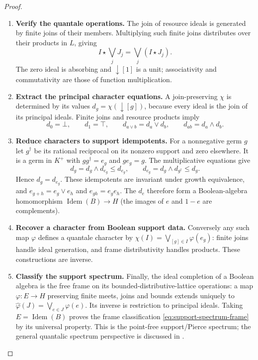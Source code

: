 \documentclass[11pt,a4paper]{article}
\numberwithin{algorithm}{section}
\numberwithin{equation}{section}
\theoremstyle{definition}
\theoremstyle{remark}
\theoremstyle{plain}
\theoremstyle{definition}
\theoremstyle{plain}
\begin{document}
\begin{proof}\leavevmode
\begin{enumerate}[leftmargin=*,align=left]
\item \textbf{Verify the quantale operations.}
The join of resource ideals is generated by finite joins of their
members.  Multiplying such finite joins distributes over their
products in $L$, giving
\[
 I\star\bigvee_jJ_j=\bigvee_j(I\star J_j).
\]
The zero ideal is absorbing and $\downarrow[1]$ is a unit;
associativity and commutativity are those of function multiplication.

\item \textbf{Extract the principal character equations.}
A join-preserving $\chi$ is determined by its values
$d_g=\chi(\downarrow[g])$, because every ideal is the
join of its principal ideals.  Finite joins and resource products
imply
\[
 d_0=\bot,\qquad d_1=\top,\qquad
 d_{a\vee b}=d_a\vee d_b,\qquad d_{ab}=d_a\wedge d_b.
\]

\item \textbf{Reduce characters to support idempotents.}
For a nonnegative germ $g$ let $g^\dagger$ be its rational
reciprocal on its nonzero support and zero elsewhere.  It is a
germ in $K^+$ with $gg^\dagger=e_g$ and $ge_g=g$.
The multiplicative equations give
\[
 d_g=d_g\wedge d_{e_g}\le d_{e_g},\qquad
 d_{e_g}=d_g\wedge d_{g^\dagger}\le d_g.
\]
Hence $d_g=d_{e_g}$.  These idempotents are invariant under
growth equivalence, and $e_{g+h}=e_g\vee e_h$ and
$e_{gh}=e_ge_h$.  The $d_e$ therefore form a Boolean-algebra
homomorphism $\operatorname{Idem}(B)\to H$ (the images of
$e$ and $1-e$ are complements).

\item \textbf{Recover a character from Boolean support data.}
Conversely any such map
$\varphi$ defines a quantale character by
$\chi(I)=\bigvee_{[g]\in I}\varphi(e_g)$: finite joins handle
ideal generation, and frame distributivity handles products.
These constructions are inverse.

\item \textbf{Classify the support spectrum.}
Finally, the ideal completion of a Boolean algebra is the free
frame on its bounded-distributive-lattice operations: a map
$\varphi:E\to H$ preserving finite meets, joins and bounds
extends uniquely to
$\widehat\varphi(J)=\bigvee_{e\in J}\varphi(e)$.
Its inverse is restriction to principal ideals.  Taking
$E=\operatorname{Idem}(B)$ proves the frame classification
\eqref{eq:support-spectrum-frame} by its universal property.  This is the point-free
support/Pierce spectrum; the general quantalic spectrum
perspective is discussed in \citep{ManuellSpectrum}.
\end{enumerate}
\end{proof}
\end{document}
